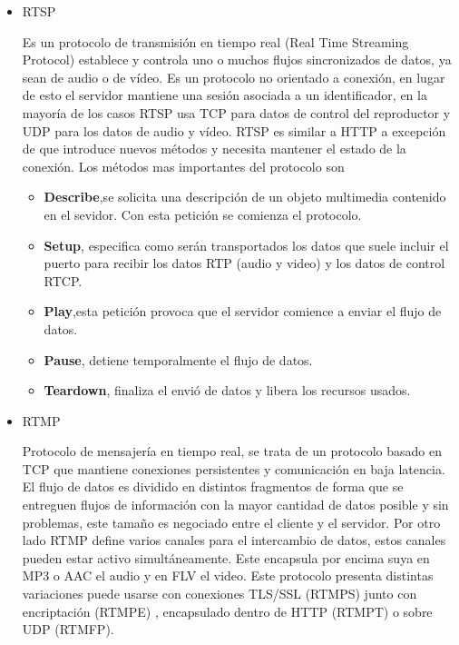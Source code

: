 \begin{itemize}
    
\item RTSP
    
Es un protocolo de transmisión en tiempo real (Real Time Streaming Protocol) establece y controla uno o muchos flujos sincronizados de datos, ya sean de audio o de vídeo. Es un protocolo no orientado a conexión, en lugar de esto el servidor mantiene una sesión asociada a un identificador, en la mayoría de los casos RTSP usa TCP para datos de control del reproductor y UDP para los datos de audio y vídeo. RTSP es similar a HTTP a excepción de que introduce nuevos métodos y necesita mantener el estado de la conexión. Los métodos mas importantes del protocolo son 

    \begin{itemize}
        \item \textbf{Describe},se solicita una descripción de un objeto multimedia contenido en el sevidor. Con esta petición se comienza el protocolo.
        \item \textbf{Setup}, especifica como serán transportados los datos que suele incluir el puerto para recibir los datos RTP (audio y video) y los datos de control RTCP.
        \item \textbf{Play},esta petición provoca que el servidor comience a enviar el flujo de datos.
        \item \textbf{Pause}, detiene temporalmente el flujo de datos.
        \item \textbf{Teardown}, finaliza el envió de datos y libera los recursos usados.
    \end{itemize}   

\item RTMP

Protocolo de mensajería en tiempo real, se trata de un protocolo basado en TCP que mantiene conexiones persistentes y comunicación en baja latencia. El flujo de datos es dividido en distintos fragmentos de forma que se entreguen flujos de información con la mayor cantidad de datos posible y sin problemas, este tamaño es negociado entre el cliente y el servidor. Por otro lado RTMP define varios canales para el intercambio de datos, estos canales pueden estar activo simultáneamente. Este encapsula por encima suya en MP3 o AAC el audio y en FLV el video. 
Este protocolo presenta distintas variaciones puede usarse con conexiones TLS/SSL (RTMPS) junto con encriptación (RTMPE) , encapsulado dentro de HTTP (RTMPT) o sobre UDP (RTMFP).



\end{itemize}
